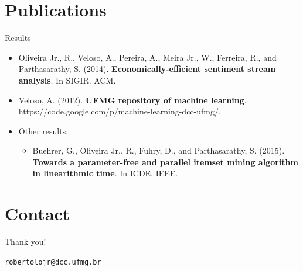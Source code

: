 \documentclass[14pt]{beamer}
\begin{document}
\section{Publications}
\begin{frame}{Results}
\begin{small}
\begin{itemize}
\item Oliveira Jr., R., Veloso, A., Pereira, A., Meira Jr., W., Ferreira, R., and Parthasarathy, S. (2014). \textbf{Economically-efficient sentiment stream analysis}. In SIGIR. ACM.
\item Veloso, A. (2012). \textbf{UFMG repository of machine learning}. https://code.google.com/p/machine-learning-dcc-ufmg/.
\item Other results:
\begin{itemize}
\item Buehrer, G., Oliveira Jr., R., Fuhry, D., and Parthasarathy, S. (2015). \textbf{Towards a parameter-free and parallel itemset mining algorithm in linearithmic time}. In ICDE. IEEE.
\end{itemize}
\end{itemize}
\end{small}
\end{frame}

\section{Contact}
\begin{frame}{Thank you!}
\begin{center}
\tt robertolojr@dcc.ufmg.br\\
\end{center}
\end{frame}
\end{document}
